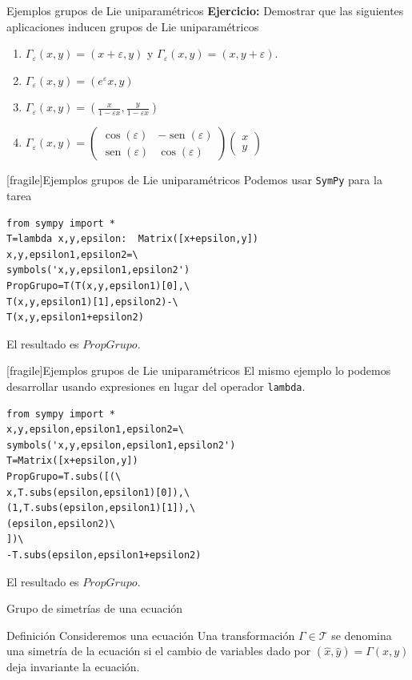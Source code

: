 \documentclass{article}
\renewcommand{\epsilon}{\varepsilon}
\DeclareMathOperator{\sen}{sen}
\newcounter{ejemplo_cont}
\begin{document}
{Ejemplos grupos de Lie uniparamétricos}
\textbf{Ejercicio:} Demostrar que las siguientes aplicaciones inducen grupos de Lie uniparamétricos
\begin{enumerate}
\item $\Gamma_{\epsilon}(x,y)=(x+\epsilon,y)$ y $\Gamma_{\epsilon}(x,y)=(x,y+\epsilon)$.
\item $\Gamma_{\epsilon}(x,y)=(e^{\epsilon}x,y)$
\item$\Gamma_{\epsilon}(x,y)=\left(\frac{x}{1-\epsilon x},\frac{y}{1-\epsilon x} \right)$
\item$\Gamma_{\epsilon}(x,y)=\begin{pmatrix} \cos(\epsilon) & -\sen(\epsilon)
\\ \sen(\epsilon) & \cos(\epsilon)
\end{pmatrix} \begin{pmatrix} x\\ y
\end{pmatrix}
$
\end{enumerate}



[fragile]{Ejemplos grupos de Lie uniparamétricos}
Podemos usar \texttt{SymPy} para la tarea
\begin{lstlisting}
from sympy import *
T=lambda x,y,epsilon:  Matrix([x+epsilon,y])
x,y,epsilon1,epsilon2=\
symbols('x,y,epsilon1,epsilon2')
PropGrupo=T(T(x,y,epsilon1)[0],\
T(x,y,epsilon1)[1],epsilon2)-\
T(x,y,epsilon1+epsilon2)
\end{lstlisting}

El resultado es ${PropGrupo}$.


[fragile]{Ejemplos grupos de Lie uniparamétricos}
El mismo ejemplo lo podemos desarrollar usando expresiones en lugar del operador \texttt{lambda}.
\begin{lstlisting}
from sympy import *
x,y,epsilon,epsilon1,epsilon2=\
symbols('x,y,epsilon,epsilon1,epsilon2')
T=Matrix([x+epsilon,y])
PropGrupo=T.subs([(\
x,T.subs(epsilon,epsilon1)[0]),\
(1,T.subs(epsilon,epsilon1)[1]),\
(epsilon,epsilon2)\
])\
-T.subs(epsilon,epsilon1+epsilon2)

\end{lstlisting}

El resultado es ${PropGrupo}$.




{Grupo de simetrías de una ecuación}

{Definición}
 Consideremos una ecuación
Una transformación $\Gamma\in \mathscr{T}$ se denomina una simetría de la ecuación si el cambio de variables dado por $(\hat{x},\hat{y})=\Gamma(x,y)$ deja invariante  la ecuación. 
\end{document}
